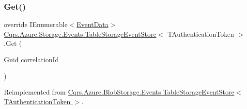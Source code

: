 \subsubsection{\texorpdfstring{Get()}{Get()}\hspace{0.1cm}{\footnotesize\ttfamily [2/2]}}
{\footnotesize\ttfamily override I\+Enumerable$<$\hyperlink{classCqrs_1_1Events_1_1EventData}{Event\+Data}$>$ \hyperlink{classCqrs_1_1Azure_1_1Storage_1_1Events_1_1TableStorageEventStore}{Cqrs.\+Azure.\+Storage.\+Events.\+Table\+Storage\+Event\+Store}$<$ T\+Authentication\+Token $>$.Get (\begin{DoxyParamCaption}\item[{Guid}]{correlation\+Id }\end{DoxyParamCaption})\hspace{0.3cm}{\ttfamily [virtual]}}



Reimplemented from \hyperlink{classCqrs_1_1Azure_1_1BlobStorage_1_1Events_1_1TableStorageEventStore_a9b952a9257dc6f458b98eba87684412e_a9b952a9257dc6f458b98eba87684412e}{Cqrs.\+Azure.\+Blob\+Storage.\+Events.\+Table\+Storage\+Event\+Store$<$ T\+Authentication\+Token $>$}.

